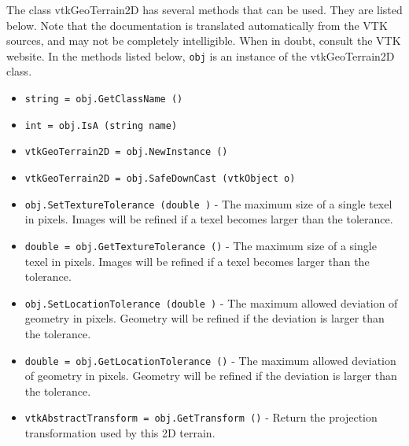 The class vtkGeoTerrain2D has several methods that can be used.
  They are listed below.
Note that the documentation is translated automatically from the VTK sources,
and may not be completely intelligible.  When in doubt, consult the VTK website.
In the methods listed below, \verb|obj| is an instance of the vtkGeoTerrain2D class.
\begin{itemize}
\item  \verb|string = obj.GetClassName ()|

\item  \verb|int = obj.IsA (string name)|

\item  \verb|vtkGeoTerrain2D = obj.NewInstance ()|

\item  \verb|vtkGeoTerrain2D = obj.SafeDownCast (vtkObject o)|

\item  \verb|obj.SetTextureTolerance (double )| -  The maximum size of a single texel in pixels.
 Images will be refined if a texel becomes larger than the tolerance.

\item  \verb|double = obj.GetTextureTolerance ()| -  The maximum size of a single texel in pixels.
 Images will be refined if a texel becomes larger than the tolerance.

\item  \verb|obj.SetLocationTolerance (double )| -  The maximum allowed deviation of geometry in pixels.
 Geometry will be refined if the deviation is larger than the tolerance.

\item  \verb|double = obj.GetLocationTolerance ()| -  The maximum allowed deviation of geometry in pixels.
 Geometry will be refined if the deviation is larger than the tolerance.

\item  \verb|vtkAbstractTransform = obj.GetTransform ()| -  Return the projection transformation used by this 2D terrain.

\end{itemize}
